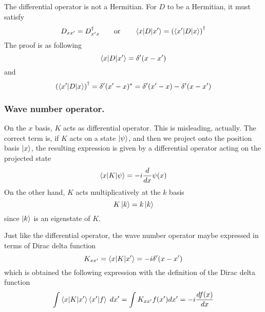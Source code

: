 \documentclass[../main.tex]{subfiles}
\begin{document}
The differential operator is not a Hermitian.
For $D$ to be a Hermitian, it must satisfy
\begin{equation*}
	D_{xx'}=D_{x'x}^\dagger\qquad\text{or}\qquad \braket{x|D|x'}=\left(\braket{x'|D|x}\right)^\dagger
\end{equation*}
The proof is as following
\begin{equation*}
	\braket{x|D|x'}=\delta'(x-x')
\end{equation*}
and
\begin{equation*}
	\left(\braket{x'|D|x}\right)^\dagger=\delta'(x'-x)^*=\delta'(x'-x)-\delta'(x-x')
\end{equation*}

\subsubsection{Wave number operator.}
On the $x$ basis, $K$ acts as differential operator.
This is misleading, actually. 
The correct term is, if $K$ acts on a state $\ket{\psi}$, and then we project onto the position basis $\ket{x}$, the resulting expression is given by a differential operator acting on the projected state
\begin{equation*}
	\braket{x|K|\psi}=-i \frac{d }{dx}\psi(x)
\end{equation*}
On the other hand, $K$ acts multiplicatively at the $k$ basis
\begin{equation*}
	K\ket{k}=k \ket{k}
\end{equation*}
since $\ket{k}$ is an eigenstate of $K$.

Just like the differential operator, the wave number operator maybe expressed in terms of Dirac delta function
\begin{equation*}
	K_{xx'}=\braket{x|K|x'}=-i\delta'(x-x')
\end{equation*}
which is obtained the following expression with the definition of the Dirac delta function
\begin{equation*}
	\int \braket{x|K|x'}\braket{x'|f}\;dx'=\int K_{xx'}f(x')dx'=-i\frac{df(x)}{dx}
\end{equation*}
\end{document}
